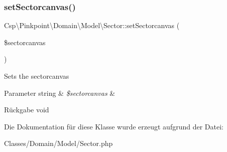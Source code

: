 \subsubsection{\texorpdfstring{set\+Sectorcanvas()}{setSectorcanvas()}}
{\footnotesize\ttfamily Csp\textbackslash{}\+Pinkpoint\textbackslash{}\+Domain\textbackslash{}\+Model\textbackslash{}\+Sector\+::set\+Sectorcanvas (\begin{DoxyParamCaption}\item[{}]{\$sectorcanvas }\end{DoxyParamCaption})}

Sets the sectorcanvas


\begin{DoxyParams}[1]{Parameter}
string & {\em \$sectorcanvas} & \\
\hline
\end{DoxyParams}
\begin{DoxyReturn}{Rückgabe}
void 
\end{DoxyReturn}


Die Dokumentation für diese Klasse wurde erzeugt aufgrund der Datei\+:\begin{DoxyCompactItemize}
\item 
Classes/\+Domain/\+Model/Sector.\+php\end{DoxyCompactItemize}
